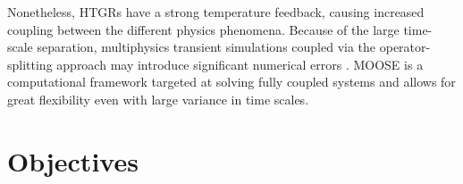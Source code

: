 \documentclass[11pt,letterpaper]{article}
\begin{document}
Nonetheless, \glspl{HTGR} have a strong temperature feedback, causing increased coupling between the different physics phenomena.
Because of the large time-scale separation, multiphysics transient simulations coupled via the operator-splitting approach may introduce significant numerical errors \cite{ragusa_consistent_2009} \cite{park_tightly_2010}.
\gls{MOOSE} \cite{gaston_moose_2009} is a computational framework targeted at solving fully coupled systems and allows for great flexibility even with large variance in time scales.






\section{Objectives}


\pagebreak


\end{document}
